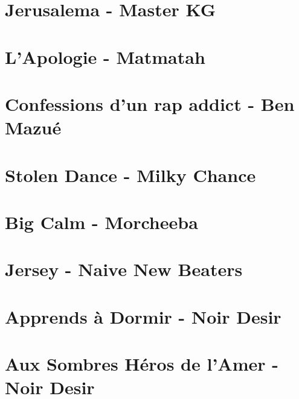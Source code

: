 \documentclass[11pt]{article}
\begin{document}
\section{Jerusalema - Master KG}


\section{L'Apologie - Matmatah}


\section{Confessions d'un rap addict - Ben Mazué}
\begin{guitar}

\end{guitar}

\section{Stolen Dance - Milky Chance}
\begin{guitar}

\end{guitar}


\section{Big Calm - Morcheeba}


\section{Jersey - Naive New Beaters}
\begin{guitar}

\end{guitar}



\section{Apprends à Dormir - Noir Desir}
\begin{guitar}

\end{guitar}

\section{Aux Sombres Héros de l'Amer - Noir Desir}
\begin{guitar}

\end{guitar}
\end{document}
